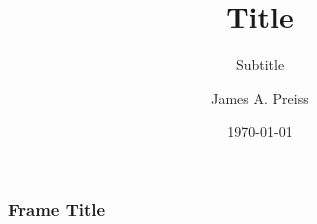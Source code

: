 \documentclass{beamer}
\title{Title}
\subtitle{Subtitle}
\author{James A. Preiss}
\institute{University of Southern California}
\date{\monthyear\today}
\begin{document}
\frame{\titlepage}


\begin{frame}
\frametitle{Frame Title}
\begin{center}
\end{center}
\end{frame}
\end{document}
